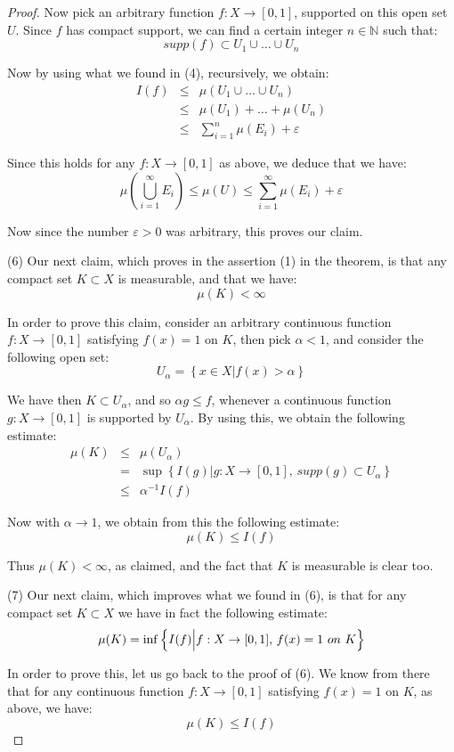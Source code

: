 \documentclass[10pt,a4paper]{amsart}
\begin{document}
\begin{proof}
Now pick an arbitrary function $f:X\to[0,1]$, supported on this open set $U$. Since $f$ has compact support, we can find a certain integer $n\in\mathbb N$ such that:
$$supp(f)\subset U_1\cup\ldots\cup U_n$$

Now by using what we found in (4), recursively, we obtain:
\begin{eqnarray*}
I(f)
&\leq&\mu(U_1\cup\ldots\cup U_n)\\
&\leq&\mu(U_1)+\ldots+\mu(U_n)\\
&\leq&\sum_{i=1}^n\mu(E_i)+\varepsilon
\end{eqnarray*}

Since this holds for any $f:X\to[0,1]$ as above, we deduce that we have:
$$\mu\left(\bigcup_{i=1}^\infty E_i\right)
\leq\mu(U)
\leq\sum_{i=1}^\infty\mu(E_i)+\varepsilon$$

Now since the number $\varepsilon>0$ was arbitrary, this proves our claim.

\medskip

(6) Our next claim, which proves in the assertion (1) in the theorem, is that any compact set $K\subset X$ is measurable, and that we have:
$$\mu(K)<\infty$$

In order to prove this claim, consider an arbitrary continuous function $f:X\to[0,1]$ satisfying $f(x)=1$ on $K$, then pick $\alpha<1$, and consider the following open set:
$$U_\alpha=\left\{x\in X\Big|f(x)>\alpha\right\}$$

We have then $K\subset U_\alpha$, and so $\alpha g\leq f$, whenever a continuous function $g:X\to[0,1]$ is supported by $U_\alpha$. By using this, we obtain the following estimate:
\begin{eqnarray*}
\mu(K)
&\leq&
\mu(U_\alpha)\\
&=&\sup\left\{I(g)\Big|g:X\to[0,1],\,supp(g)\subset U_\alpha\right\}\\
&\leq&\alpha^{-1}I(f)
\end{eqnarray*}

Now with $\alpha\to 1$, we obtain from this the following estimate:
$$\mu(K)\leq I(f)$$

Thus $\mu(K)<\infty$, as claimed, and the fact that $K$ is measurable is clear too.

\medskip

(7) Our next claim, which improves what we found in (6), is that for any compact set $K\subset X$ we have in fact the following estimate:
$$\mu(K)=\inf\left\{I(f)\Big|f:X\to[0,1],\,f(x)=1\ {\rm on}\ K\right\}$$

In order to prove this, let us go back to the proof of (6). We know from there that for any continuous function $f:X\to[0,1]$ satisfying $f(x)=1$ on $K$, as above, we have:
$$\mu(K)\leq I(f)$$


\end{proof}
\end{document}
